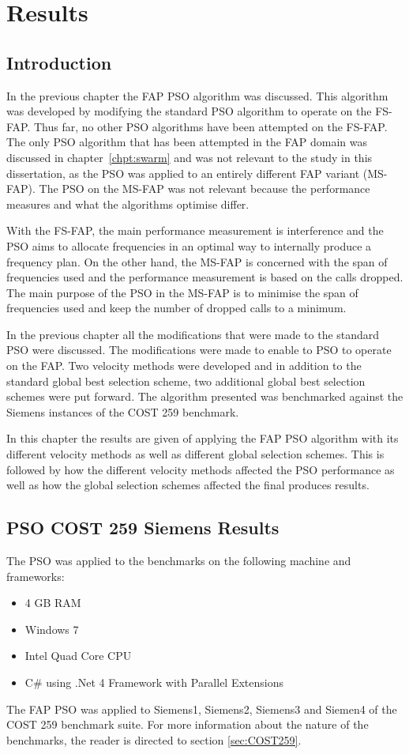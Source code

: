 \chapter{Results}
\label{chpt:results}
\section{Introduction}
In the previous chapter the FAP PSO algorithm was discussed. This algorithm was developed by modifying the standard PSO algorithm to operate on the FS-FAP. Thus far, no other PSO algorithms have been attempted on the FS-FAP. The only PSO algorithm that has been attempted in the FAP domain was discussed in chapter~\ref{chpt:swarm} and was not relevant to the study in this dissertation, as the PSO was applied to an entirely different FAP variant (MS-FAP). The PSO on the MS-FAP was not relevant because the performance measures and what the algorithms optimise differ.

With the FS-FAP, the main performance measurement is interference and the PSO aims to allocate frequencies in an optimal way to internally produce a frequency plan. On the other hand, the MS-FAP is concerned with the span of frequencies used and the performance measurement is based on the calls dropped. The main purpose of the PSO in the MS-FAP is to minimise the span of frequencies used and keep the number of dropped calls to a minimum.

In the previous chapter all the modifications that were made to the standard PSO were discussed. The modifications were made to enable to PSO to operate on the FAP. Two velocity methods were developed and in addition to the standard global best selection scheme, two additional global best selection schemes were put forward. The algorithm presented was benchmarked against the Siemens instances of the COST 259 benchmark.

In this chapter the results are given of applying the FAP PSO algorithm with its different velocity methods as well as different global selection schemes. This is followed by how the different velocity methods affected the PSO performance as well as how the global selection schemes affected the final produces results.

\section{PSO COST 259 Siemens Results}
The PSO was applied to the benchmarks on the following machine and frameworks:
\begin{itemize}
\item 4 GB RAM
\item Windows 7
\item Intel Quad Core CPU
\item C\# using .Net 4 Framework with Parallel Extensions
\end{itemize}
The FAP PSO was applied to Siemens1, Siemens2, Siemens3 and Siemen4 of the COST 259 benchmark suite. For more information about the nature of the benchmarks, the reader is directed to section \ref{sec:COST259}.


